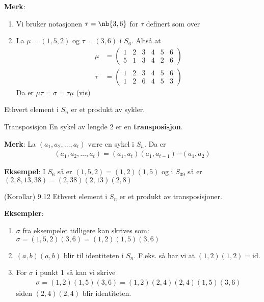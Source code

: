 \textbf{Merk}:
\begin{enumerate}
  \item Vi bruker notasjonen $\tau=\nb{3, 6}$ for $\tau$ definert som over
  \item La $\mu=(1,5,2)$ og $\tau=(3,6)$ i $S_6$. Altså at
    \begin{align}
      \mu &= \begin{pmatrix}1 & 2 & 3 & 4 & 5 & 6 \\ 5 & 1 & 3 & 4 & 2 & 6\end{pmatrix} \\
      \tau &= \begin{pmatrix}1 & 2 & 3 & 4 & 5 & 6 \\ 1 & 2 & 6 & 4 & 5 & 3\end{pmatrix} 
    \end{align}
    Da er $\mu\tau=\sigma=\tau\mu$ (vis)
\end{enumerate}

\begin{theorem*}{9.8}{}
  Ethvert element i $S_n$ er et produkt av sykler. 
\end{theorem*}

\begin{definition}{Transposisjon}{}
  En sykel av lengde 2 er en \textbf{transposisjon}.
\end{definition}

\textbf{Merk}: La $(a_1, a_2, \ldots, a_t)$ være en sykel i $S_n$. Da er
\begin{align}
  (a_1, a_2, \ldots, a_t)=(a_1, a_t)(a_1, a_{t-1})\cdots(a_1,a_2)
\end{align}

\textbf{Eksempel}: I $S_6$ så er $(1, 5, 2)=(1,2)(1,5)$ og i $S_{39}$ så er 
$(2,8,13,38)=(2,38)(2,13)(2,8)$

\begin{theorem*}{(Korollar) 9.12}{}
  Ethvert element i $S_n$ er et produkt av transposisjoner.
\end{theorem*}

\textbf{Eksempler}:
\begin{enumerate}
  \item $\sigma$ fra eksempelet tidligere kan skrives som: 
    $\sigma=(1,5,2)(3,6)=(1,2)(1,5)(3,6)$
  \item $(a,b)(a,b)$ blir til identiteten i $S_n$. F.eks. så har vi at $(1,2)(1,2)=\text{id}$.
  \item For $\sigma$ i punkt 1 så kan vi skrive
    \begin{align}
      \sigma=(1,2)(1,5)(3,6)=(1,2)(2,4)(2,4)(1,5)(3,6)
    \end{align}
    siden $(2,4)(2,4)$ blir identiteten. 
\end{enumerate}

